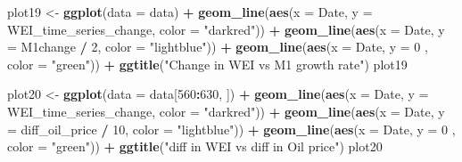 \documentclass[]{article}
\newenvironment{Shaded}{\begin{snugshade}}{\end{snugshade}}
\newcommand{\KeywordTok}[1]{\textcolor[rgb]{0.13,0.29,0.53}{\textbf{#1}}}
\newcommand{\DataTypeTok}[1]{\textcolor[rgb]{0.13,0.29,0.53}{#1}}
\newcommand{\DecValTok}[1]{\textcolor[rgb]{0.00,0.00,0.81}{#1}}
\newcommand{\StringTok}[1]{\textcolor[rgb]{0.31,0.60,0.02}{#1}}
\newcommand{\OperatorTok}[1]{\textcolor[rgb]{0.81,0.36,0.00}{\textbf{#1}}}
\newcommand{\NormalTok}[1]{#1}
\begin{document}
\begin{Shaded}
\begin{Highlighting}[]
\NormalTok{plot19 <-}\StringTok{ }\KeywordTok{ggplot}\NormalTok{(}\DataTypeTok{data =}\NormalTok{ data) }\OperatorTok{+}\StringTok{ }
\StringTok{  }\KeywordTok{geom_line}\NormalTok{(}\KeywordTok{aes}\NormalTok{(}\DataTypeTok{x =}\NormalTok{ Date, }\DataTypeTok{y =}\NormalTok{ WEI_time_series_change, }\DataTypeTok{color =} \StringTok{"darkred"}\NormalTok{)) }\OperatorTok{+}\StringTok{ }
\StringTok{  }\KeywordTok{geom_line}\NormalTok{(}\KeywordTok{aes}\NormalTok{(}\DataTypeTok{x =}\NormalTok{ Date, }\DataTypeTok{y =}\NormalTok{ M1change }\OperatorTok{/}\StringTok{ }\DecValTok{2}\NormalTok{, }\DataTypeTok{color =} \StringTok{"lightblue"}\NormalTok{)) }\OperatorTok{+}\StringTok{ }
\StringTok{  }\KeywordTok{geom_line}\NormalTok{(}\KeywordTok{aes}\NormalTok{(}\DataTypeTok{x =}\NormalTok{ Date, }\DataTypeTok{y =} \DecValTok{0}\NormalTok{ , }\DataTypeTok{color =} \StringTok{"green"}\NormalTok{)) }\OperatorTok{+}
\StringTok{  }\KeywordTok{ggtitle}\NormalTok{(}\StringTok{"Change in WEI vs M1 growth rate"}\NormalTok{)}
\NormalTok{plot19}

\NormalTok{plot20 <-}\StringTok{ }\KeywordTok{ggplot}\NormalTok{(}\DataTypeTok{data =}\NormalTok{ data[}\DecValTok{560}\OperatorTok{:}\DecValTok{630}\NormalTok{, ]) }\OperatorTok{+}\StringTok{ }
\StringTok{  }\KeywordTok{geom_line}\NormalTok{(}\KeywordTok{aes}\NormalTok{(}\DataTypeTok{x =}\NormalTok{ Date, }\DataTypeTok{y =}\NormalTok{ WEI_time_series_change, }\DataTypeTok{color =} \StringTok{"darkred"}\NormalTok{)) }\OperatorTok{+}\StringTok{ }
\StringTok{  }\KeywordTok{geom_line}\NormalTok{(}\KeywordTok{aes}\NormalTok{(}\DataTypeTok{x =}\NormalTok{ Date, }\DataTypeTok{y =}\NormalTok{ diff_oil_price }\OperatorTok{/}\StringTok{ }\DecValTok{10}\NormalTok{, }\DataTypeTok{color =} \StringTok{"lightblue"}\NormalTok{)) }\OperatorTok{+}\StringTok{ }
\StringTok{  }\KeywordTok{geom_line}\NormalTok{(}\KeywordTok{aes}\NormalTok{(}\DataTypeTok{x =}\NormalTok{ Date, }\DataTypeTok{y =} \DecValTok{0}\NormalTok{ , }\DataTypeTok{color =} \StringTok{"green"}\NormalTok{)) }\OperatorTok{+}
\StringTok{  }\KeywordTok{ggtitle}\NormalTok{(}\StringTok{"diff in WEI vs diff in Oil price"}\NormalTok{)}
\NormalTok{plot20}


\end{Highlighting}
\end{Shaded}
\end{document}
